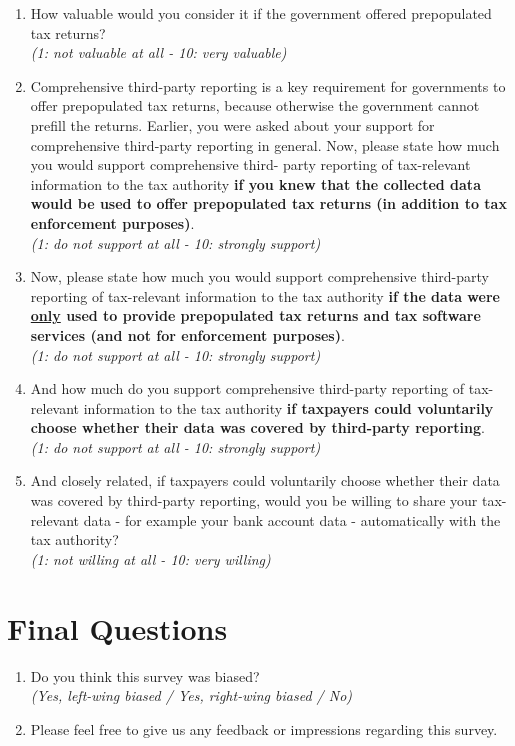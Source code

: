 \documentclass[11pt]{article}
\begin{document}
\begin{enumerate}[resume]
    \item How valuable would you consider it if the government offered prepopulated tax returns?\\
    \textit{(1: not valuable at all - 10: very valuable)}
    \item Comprehensive third-party reporting is a key requirement for governments to offer prepopulated tax returns, because otherwise the government cannot prefill the returns. Earlier, you were asked about your support for comprehensive third-party reporting in general. Now, please state how much you would support comprehensive third- party reporting of tax-relevant information to the tax authority \textbf{if you knew that the collected data would be used to offer prepopulated tax returns (in addition to tax enforcement purposes)}.\\ \textit{(1: do not support at all - 10: strongly support)}
    \item Now, please state how much you would support comprehensive third-party reporting of tax-relevant information to the tax authority \textbf{if the data were \underline{only} used to provide prepopulated tax returns and tax software services (and not for enforcement purposes)}.\\ \textit{(1: do not support at all - 10: strongly support)}
    \item And how much do you support comprehensive third-party reporting of tax-relevant information to the tax authority \textbf{if taxpayers could voluntarily choose whether their data was covered by third-party reporting}. \\
    \textit{(1: do not support at all - 10: strongly support)}
    \item And closely related, if taxpayers could voluntarily choose whether their data was covered by third-party reporting, would you be willing to share your tax-relevant  data - for example your bank account data - automatically with the tax authority?   \\
    \textit{(1: not willing at all - 10: very willing)}
\end{enumerate}
\section*{Final Questions}
\begin{enumerate}[resume]
    \item Do you think this survey was biased?\\ \textit{(Yes, left-wing biased / Yes, right-wing biased / No)}
    \item Please feel free to give us any feedback or impressions regarding this survey.
\end{enumerate}    
\end{document}
